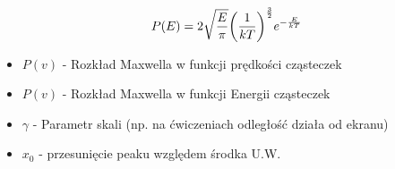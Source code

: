 \documentclass[12pt,a4paper]{report}
\begin{document}
\begin{equation}
    P(E) = 2 \sqrt{\frac{E}{\pi}} \qty(\frac{1}{k T})^{\frac32} e^{-\frac{E}{kT}}
    \label{eq:app:rozklad_maxwell_E}
\end{equation}

\begin{itemize}
    \item $P(v)$ - Rozkład Maxwella w funkcji prędkości cząsteczek
    \item $P(v)$ - Rozkład Maxwella w funkcji Energii cząsteczek
    \item $\gamma$ - Parametr skali (np. na ćwiczeniach odległość działa od ekranu)
    \item $x_0$ - przesunięcie peaku względem środka U.W.
\end{itemize}
\end{document}
